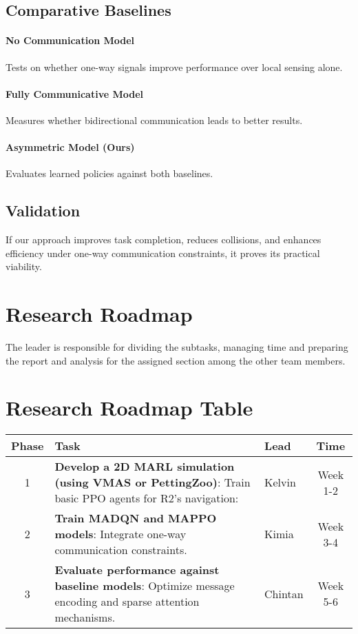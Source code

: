 \documentclass[a4paper,11pt]{article}
\begin{document}
\subsection{Comparative Baselines} 
\paragraph{No Communication Model} Tests on whether one-way signals improve performance over local sensing alone.

\paragraph{Fully Communicative Model} Measures whether bidirectional communication leads to better results.

\paragraph{Asymmetric Model (Ours)} Evaluates learned policies against both baselines.

\subsection{Validation} 
If our approach improves task completion, reduces collisions, and enhances efficiency under one-way communication constraints, it proves its practical viability.

\section{Research Roadmap} 
The leader is responsible for dividing the subtasks, managing time and preparing the report and analysis for the assigned section among the other team members. 

\section*{Research Roadmap Table}
\begin{tabular}{|c|p{5cm}|p{3cm}|c|}
    \hline
    \textbf{Phase} & \textbf{Task} & \textbf{Lead} & \textbf{Time} \\ \hline
    1 & \textbf{Develop a 2D MARL simulation (using VMAS or PettingZoo)}: \newline Train basic PPO agents for R2’s navigation: & Kelvin & Week 1-2 \\ \hline
    2 & \textbf{Train MADQN and MAPPO models}: \newline Integrate one-way communication constraints. & Kimia & Week 3-4 \\ \hline
    3 & \textbf{Evaluate performance against baseline models}: \newline Optimize message encoding and sparse attention mechanisms. & Chintan & Week 5-6 \\ \hline
\end{tabular}
\end{document}

